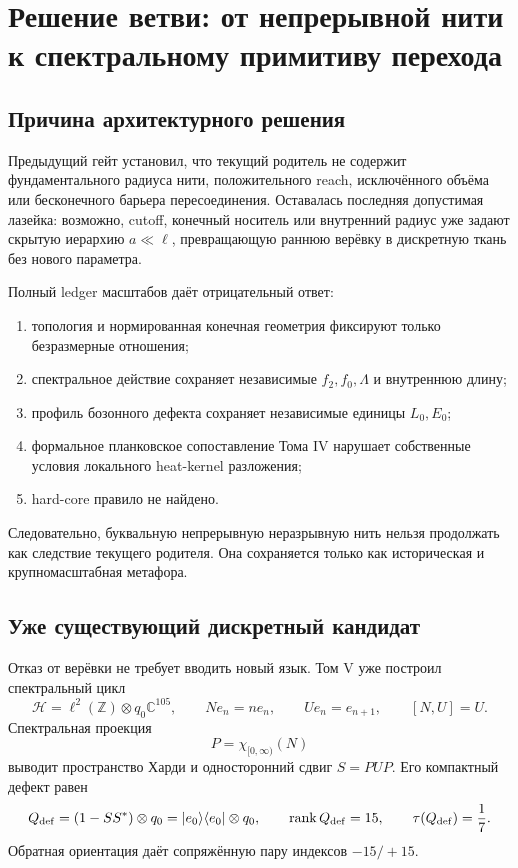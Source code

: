 \chapter{Решение ветви: от непрерывной нити к спектральному примитиву перехода}
\label{ch:v6-single-thread-scale-hierarchy-branch-decision-gate}

\section{Причина архитектурного решения}

Предыдущий гейт установил, что текущий родитель не содержит
фундаментального радиуса нити, положительного reach, исключённого объёма
или бесконечного барьера пересоединения. Оставалась последняя допустимая
лазейка: возможно, cutoff, конечный носитель или внутренний радиус уже
задают скрытую иерархию $a\ll\ell$, превращающую раннюю верёвку в
дискретную ткань без нового параметра.

Полный ledger масштабов даёт отрицательный ответ:
\begin{enumerate}
 \item топология и нормированная конечная геометрия фиксируют только
 безразмерные отношения;
 \item спектральное действие сохраняет независимые $f_2,f_0,\Lambda$ и
 внутреннюю длину;
 \item профиль бозонного дефекта сохраняет независимые единицы $L_0,E_0$;
 \item формальное планковское сопоставление Тома IV нарушает собственные
 условия локального heat-kernel разложения;
 \item hard-core правило не найдено.
\end{enumerate}

Следовательно, буквальную непрерывную неразрывную нить нельзя продолжать
как следствие текущего родителя. Она сохраняется только как историческая
и крупномасштабная метафора.

\section{Уже существующий дискретный кандидат}

Отказ от верёвки не требует вводить новый язык. Том V уже построил
спектральный цикл
\begin{equation}
 \mathcal H=\ell^2(\mathbb Z)\otimes q_0\mathbb C^{105},
 \qquad
 Ne_n=ne_n,
 \qquad
 Ue_n=e_{n+1},
 \qquad
 [N,U]=U.
\end{equation}
Спектральная проекция
\begin{equation}
 P=\chi_{[0,\infty)}(N)
\end{equation}
выводит пространство Харди и односторонний сдвиг $S=PUP$. Его компактный
дефект равен
\begin{equation}
 Q_{\rm def}
 =(1-SS^*)\otimes q_0
 =|e_0\rangle\langle e_0|\otimes q_0,
 \qquad
 \operatorname{rank} Q_{\rm def}=15,
 \qquad
 \tau(Q_{\rm def})=\frac17.
\end{equation}
Обратная ориентация даёт сопряжённую пару индексов $-15/+15$.

